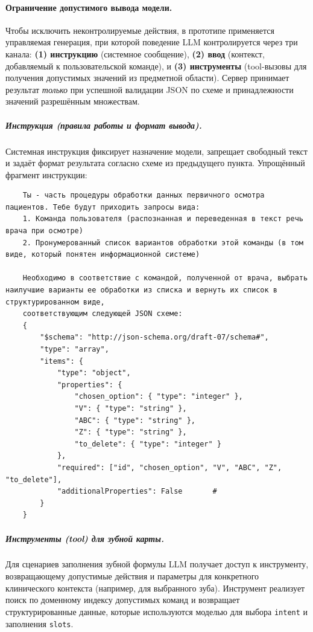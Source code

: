 \paragraph{Ограничение допустимого вывода модели.}
Чтобы исключить неконтролируемые действия, в прототипе применяется управляемая генерация, при которой поведение LLM контролируется через три канала:
\textbf{(1) инструкцию} (системное сообщение), \textbf{(2) ввод} (контекст, добавляемый к пользовательской команде), и \textbf{(3) инструменты} (tool-вызовы для получения допустимых значений из предметной области).
Сервер принимает результат \emph{только} при успешной валидации JSON по схеме и принадлежности значений разрешённым множествам.

\subparagraph{Инструкция (правила работы и формат вывода).}
Системная инструкция фиксирует назначение модели, запрещает свободный текст и задаёт формат результата согласно схеме из предыдущего пункта.
Упрощённый фрагмент инструкции:

\begin{verbatim}
    Ты - часть процедуры обработки данных первичного осмотра пациентов. Тебе будут приходить запросы вида:
    1. Команда пользователя (распознанная и переведенная в текст речь врача при осмотре)
    2. Пронумерованный список вариантов обработки этой команды (в том виде, который понятен информационной системе)

    Необходимо в соответствие с командой, полученной от врача, выбрать наилучшие варианты ее обработки из списка и вернуть их список в структурированном виде,
    соответствующим следующей JSON схеме:
    {
        "$schema": "http://json-schema.org/draft-07/schema#",
        "type": "array",
        "items": {
            "type": "object",
            "properties": {
                "chosen_option": { "type": "integer" },
                "V": { "type": "string" },
                "ABC": { "type": "string" },
                "Z": { "type": "string" },
                "to_delete": { "type": "integer" }
            },
            "required": ["id", "chosen_option", "V", "ABC", "Z", "to_delete"],
            "additionalProperties": False       #
        }
    }
\end{verbatim}

\subparagraph{Инструменты (tool) для зубной карты.}
Для сценариев заполнения зубной формулы LLM получает доступ к инструменту, возвращающему допустимые действия и параметры
для конкретного клинического контекста (например, для выбранного зуба).
Инструмент реализует поиск по доменному индексу допустимых команд и возвращает структурированные данные,
которые используются моделью для выбора \texttt{intent} и заполнения \texttt{slots}.

